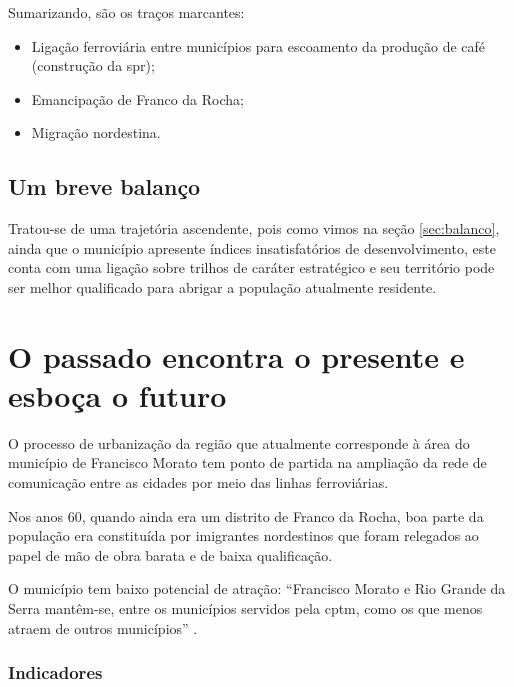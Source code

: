	Sumarizando, são os traços marcantes:
	
	\begin{itemize}
		\item Ligação ferroviária entre municípios para escoamento da produção de café (construção da \gls{spr});
		\item Emancipação de Franco da Rocha;
		\item Migração nordestina.
	\end{itemize}
	
	\section{Um breve balanço}
		
	Tratou-se de uma trajetória ascendente, pois como vimos na seção \ref{sec:balanco}, ainda que o município apresente índices insatisfatórios de desenvolvimento, este conta com uma ligação sobre trilhos de caráter estratégico e seu território pode ser melhor qualificado para abrigar a população atualmente residente.

	\chapter{O passado encontra o presente e esboça o futuro}
	
	O processo de urbanização da região que atualmente corresponde à área do município de Francisco Morato tem ponto de partida na ampliação da rede de comunicação entre as cidades por meio das linhas ferroviárias.
	
	Nos anos 60, quando ainda era um distrito de Franco da Rocha, boa parte da população era constituída por imigrantes nordestinos que foram relegados ao papel de mão de obra barata e de baixa qualificação.
	
	O município tem baixo potencial de atração: ``Francisco Morato e Rio Grande da Serra mantêm-se, entre os municípios servidos pela \gls{cptm}, como os que menos atraem de outros municípios'' \cite[p.80]{ferreira2010a}.
	
	\subsection{Indicadores}
	
